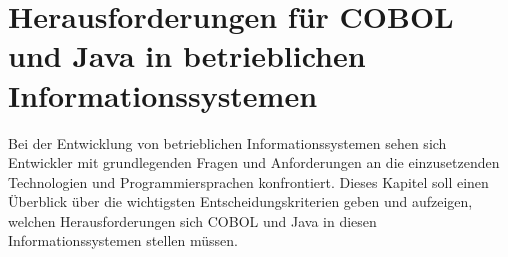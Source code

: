 \chapter{Herausforderungen für COBOL und Java in betrieblichen Informationssystemen}
Bei der Entwicklung von betrieblichen Informationssystemen sehen sich Entwickler mit grundlegenden Fragen und Anforderungen an die einzusetzenden Technologien und Programmiersprachen konfrontiert. Dieses Kapitel soll einen Überblick über die wichtigsten Entscheidungskriterien geben und aufzeigen, welchen Herausforderungen sich COBOL und Java in diesen Informationssystemen stellen müssen.

\label{ch:herausforderungen}
    
    
    
    